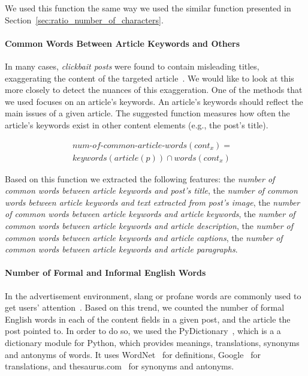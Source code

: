 \documentclass{sig-alternate}
\begin{document}
We used this function the same way we used the similar function presented in Section~\ref{sec:ratio_number_of_characters}.

\paragraph{Common Words Between Article Keywords and Others} 
\label{sec:common_words_between_article_keywords_and_others}
In many cases, \emph{clickbait posts} were found to contain misleading titles, exaggerating the content of the targeted article~\cite{biyani20168}. 
We would like to look at this more closely to detect the nuances of this exaggeration.
One of the methods that we used focuses on an article's keywords.  
An article's keywords should reflect the main issues of a given article.
The suggested function measures how often the article's keywords exist in other content elements (e.g., the post's title).   

\begin{equation}
\begin{aligned}
num\text{-}of\text{-}common\text{-}article\text{-}words(cont_x) ={} &  \\
keywords(article(p)) \cap words(cont_x) &  
\end{aligned}
\end{equation}

Based on this function we extracted the following features: the \emph{number of common words between article keywords and post's title}, the \emph{number of common words between article keywords and text extracted from post's image}, the \emph{number of common words between article keywords and article keywords}, the \emph{number of common words between article keywords and article description}, the \emph{number of common words between article keywords and article captions}, the \emph{number of common words between article keywords and article paragraphs}. 

\paragraph{Number of Formal and Informal English Words} 
\label{sec:number_of_formal_and_informal_words}
In the advertisement environment, slang or profane words are commonly used to get users' attention~\cite{zhou2015filtering}.   
Based on this trend, we counted the number of formal English words in each of the content fields in a given post, and the article the post pointed to.
In order to do so, we used the PyDictionary~\cite{pydictionary}, which is a a dictionary module for Python, which provides meanings, translations, synonyms and antonyms of words.
It uses WordNet~\cite{wordnet} for definitions, Google~\cite{google_translate} for translations, and thesaurus.com~\cite{thesaurus} for synonyms and antonyms. 
\end{document}
